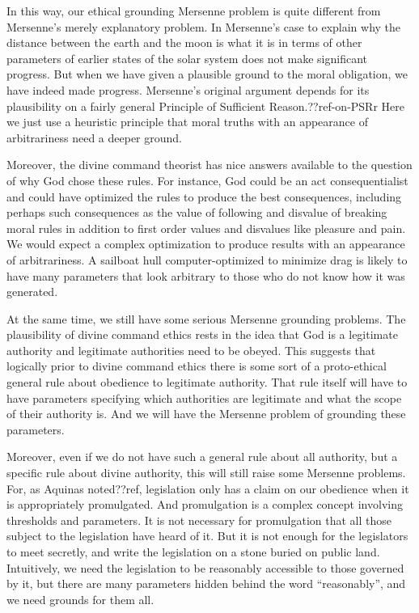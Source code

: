 In this way, our ethical grounding Mersenne problem is quite different from Mersenne's merely explanatory problem. In Mersenne's case
to explain why the distance between the earth and the moon is what it is in terms of other parameters of earlier states of the
solar system does not make significant progress. But when we have given a plausible ground to the moral obligation, we have
indeed made progress. Mersenne's original argument depends for its plausibility on a fairly general Principle of Sufficient
Reason.??ref-on-PSRr Here we just use a heuristic principle that moral truths with
an appearance of arbitrariness need a deeper ground.

Moreover, the divine command theorist has nice answers available to the question of why God chose these rules. For instance,
God could be an act consequentialist and could have optimized the rules to produce the best consequences, including perhaps
such consequences as the value of following and disvalue of breaking moral rules in addition to first order values and 
disvalues like pleasure and pain.  We would expect a complex optimization to produce results with an appearance of arbitrariness.
A sailboat hull computer-optimized to minimize drag is likely to have many parameters that look arbitrary to those who do not
know how it was generated.

At the same time, we still have some serious Mersenne grounding problems. The plausibility of divine command ethics rests in
the idea that God is a legitimate authority and legitimate authorities need to be obeyed. This suggests that logically prior
to divine command ethics there is some sort of a proto-ethical general rule about obedience to legitimate authority. That 
rule itself will have to have parameters specifying which authorities are legitimate and what the scope of their authority is. 
And we will have the Mersenne problem of grounding these parameters.

Moreover, even if we do not have such a general rule about all authority, but a specific rule about divine authority, this
will still raise some Mersenne problems. For, as Aquinas noted??ref, legislation only has a claim on our obedience when it 
is appropriately promulgated. And promulgation is a complex concept involving thresholds and parameters. It is not necessary
for promulgation that all those subject to the legislation have heard of it. But it is not enough for the legislators to
meet secretly, and write the legislation on a stone  buried on public land. Intuitively, we need the legislation to be 
reasonably accessible to those governed by it, but there are many parameters hidden behind the word ``reasonably'', and 
we need grounds for them all.

